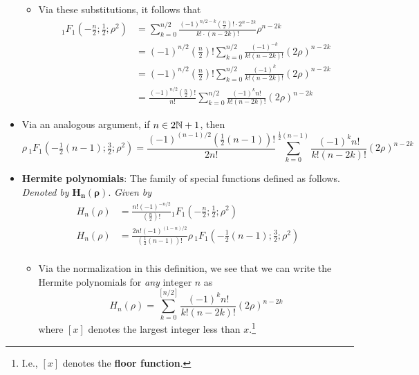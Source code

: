 \documentclass[../finalProject.tex]{subfiles}
\begin{document}
\begin{itemize}
\begin{itemize}
\begin{itemize}
        \end{itemize}
        \item Via these substitutions, it follows that
        \begin{align*}
            {}_1F_1(-\tfrac{n}{2};\tfrac{1}{2};\rho^2) &= \sum_{k=0}^{n/2}\frac{(-1)^{n/2-k}\left( \frac{n}{2} \right)!\cdot 2^{n-2k}}{k!\cdot(n-2k)!}\rho^{n-2k}\\
            &= (-1)^{n/2}\left( \tfrac{n}{2} \right)!\sum_{k=0}^{n/2}\frac{(-1)^{-k}}{k!(n-2k)!}(2\rho)^{n-2k}\\
            &= (-1)^{n/2}\left( \tfrac{n}{2} \right)!\sum_{k=0}^{n/2}\frac{(-1)^k}{k!(n-2k)!}(2\rho)^{n-2k}\\
            &= \frac{(-1)^{n/2}\left( \frac{n}{2} \right)!}{n!}\sum_{k=0}^{n/2}\frac{(-1)^kn!}{k!(n-2k)!}(2\rho)^{n-2k}
        \end{align*}
    \end{itemize}
    \item Via an analogous argument, if $n\in 2\mathbb{N}+1$, then
    \begin{equation*}
        \rho\,{}_1F_1(-\tfrac{1}{2}(n-1);\tfrac{3}{2};\rho^2) = \frac{(-1)^{(n-1)/2}\left( \frac{1}{2}(n-1) \right)!}{2n!}\sum_{k=0}^{\frac{1}{2}(n-1)}\frac{(-1)^kn!}{k!(n-2k)!}(2\rho)^{n-2k}
    \end{equation*}
    \item \textbf{Hermite polynomials}: The family of special functions defined as follows. \emph{Denoted by} $\bm{H_n(\rho)}$. \emph{Given by}
    \begin{align*}
        H_n(\rho) &= \frac{n!(-1)^{-n/2}}{\left( \frac{n}{2} \right)!}{}_1F_1(-\tfrac{n}{2};\tfrac{1}{2};\rho^2)\tag{$n$ even}\\
        H_n(\rho) &= \frac{2n!(-1)^{(1-n)/2}}{\left( \frac{1}{2}(n-1) \right)!}\rho\,{}_1F_1(-\tfrac{1}{2}(n-1);\tfrac{3}{2};\rho^2)\tag{$n$ odd}\\
    \end{align*}
    \begin{itemize}
        \item Via the normalization in this definition, we see that we can write the Hermite polynomials for \emph{any} integer $n$ as
        \begin{equation*}
            H_n(\rho) = \sum_{k=0}^{[n/2]}\frac{(-1)^kn!}{k!(n-2k)!}(2\rho)^{n-2k}
        \end{equation*}
        where $[x]$ denotes the largest integer less than $x$.\footnote{I.e., $[x]$ denotes the \textbf{floor function}.}

\end{itemize}
\end{itemize}
\end{document}
